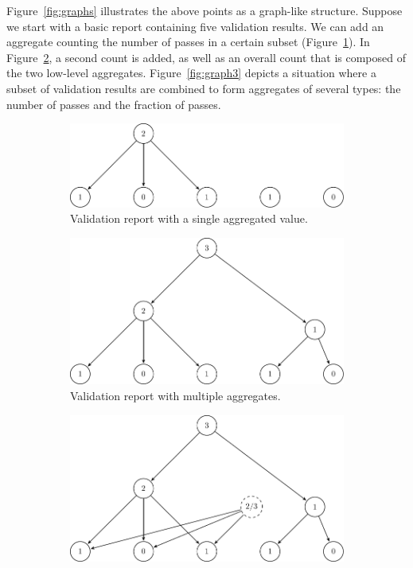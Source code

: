 \documentclass[a4paper, 11pt,titlepage]{article}
\begin{document}
Figure~\ref{fig:graphs} illustrates the above points as a graph-like structure.
Suppose we start with a basic report containing five validation results. We can
add an aggregate counting the number of passes in a certain subset
(Figure~\ref{fig:graph1}).  In Figure~\ref{fig:graph2}, a second count is
added, as well as an overall count that is composed of the two low-level
aggregates. Figure~\ref{fig:graph3} depicts a situation where a subset of
validation results are combined to form aggregates of several types: the number
of passes and the fraction of passes.
%
\begin{figure}[!t]
  \centering
  \begin{subfigure}[b]{0.7\textwidth}
    \includegraphics[width=\textwidth]{fig/graph1.pdf}
    \caption{Validation report with a single aggregated value.}
    \label{fig:graph1}
  \end{subfigure}
  \begin{subfigure}[b]{0.7\textwidth}
    \includegraphics[width=\textwidth]{fig/graph2.pdf}
    \caption{Validation report with multiple aggregates.}
    \label{fig:graph2}
  \end{subfigure}
  \begin{subfigure}[b]{0.7\textwidth}
    \includegraphics[width=\textwidth]{fig/graph3.pdf}

\end{subfigure}
\end{figure}
\end{document}
